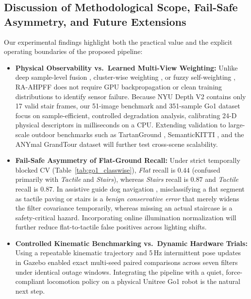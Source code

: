 \documentclass[11pt, a4paper]{article}
\begin{document}
\subsection{Discussion of Methodological Scope, Fail-Safe Asymmetry, and Future Extensions}
\label{subsec:discussion}
Our experimental findings highlight both the practical value and the explicit operating boundaries of the proposed pipeline:
\begin{itemize}
    \item \textbf{Physical Observability vs.\ Learned Multi-View Weighting:} Unlike deep sample-level fusion \cite{yang2025deep, he2026adaptive}, cluster-wise weighting \cite{hu2022view}, or fuzzy self-weighting \cite{zhu2020self, shi2025deep}, RA-AHPFF does not require GPU backpropagation or clean training distributions to identify sensor failure. Because NYU Depth V2 contains only 17 valid stair frames, our 51-image benchmark and 351-sample Go1 dataset focus on sample-efficient, controlled degradation analysis, calibrating 24-D physical descriptors in milliseconds on a CPU. Extending validation to large-scale outdoor benchmarks such as TartanGround \cite{patel2025tartanground}, SemanticKITTI \cite{behley2019semantickitti}, and the ANYmal GrandTour dataset \cite{tuna2026grandtour} will further test cross-scene scalability.
    \item \textbf{Fail-Safe Asymmetry of Flat-Ground Recall:} Under strict temporally blocked CV (Table~\ref{tab:go1_classwise}), \textit{Flat} recall is $0.44$ (confused primarily with \textit{Tactile} and \textit{Stairs}), whereas \textit{Stairs} recall is $0.87$ and \textit{Tactile} recall is $0.87$. In assistive guide dog navigation \cite{kim2023transforming, cai2024navigating, yu2026human}, misclassifying a flat segment as tactile paving or stairs is a \textit{benign conservative error} that merely widens the filter covariance temporarily, whereas missing an actual staircase is a safety-critical hazard. Incorporating online illumination normalization will further reduce flat-to-tactile false positives across lighting shifts.
    \item \textbf{Controlled Kinematic Benchmarking vs.\ Dynamic Hardware Trials:} Using a repeatable kinematic trajectory and 5\,Hz intermittent pose updates in Gazebo enabled exact multi-seed paired comparisons across seven filters under identical outage windows. Integrating the pipeline with a quiet, force-compliant locomotion policy \cite{fan2024force, fan2025force, yu2026human} on a physical Unitree Go1 robot is the natural next step.
\end{itemize}
\end{document}
